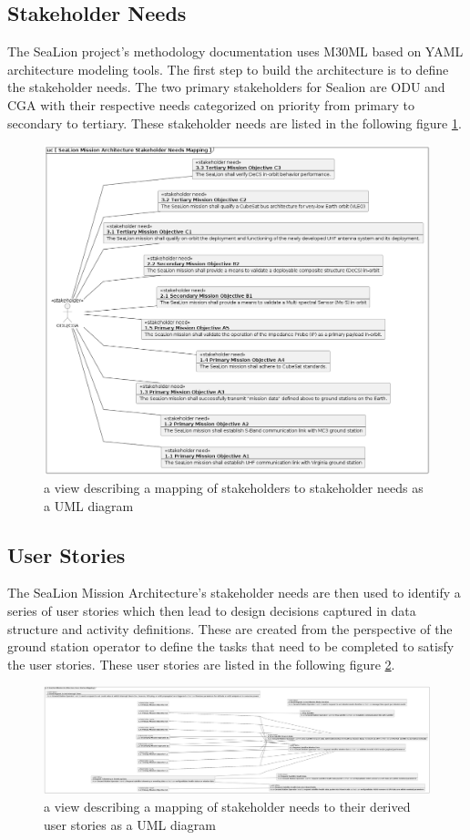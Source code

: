 \documentclass[conf]{new-aiaa}
\begin{document}
\subsection{Stakeholder Needs}

The SeaLion project's methodology documentation uses M30ML based on YAML architecture modeling tools. The first step to build the architecture is to define the stakeholder needs. The two primary stakeholders for Sealion are ODU and CGA with their respective needs categorized on priority from primary to secondary to tertiary. These stakeholder needs are listed in the following figure \ref{stakeholder-needs-mapping}.

\begin{figure}[hbt!]
    \centering
    \includegraphics[width=.5\textwidth]{stakeholder-needs-mapping}
    \caption{a view describing a mapping of stakeholders to stakeholder needs as a UML diagram}
    \label{stakeholder-needs-mapping}
\end{figure}

\subsection{User Stories}

The SeaLion Mission Architecture's stakeholder needs are then used to identify a series of user stories which then lead to design decisions captured in data structure and activity definitions. These are created from the perspective of the ground station operator to define the tasks that need to be completed to satisfy the user stories. These user stories are listed in the following figure \ref{user-stories-mapping}.

\begin{figure}[hbt!]
    \centering
    \includegraphics[width=.5\textwidth]{user-stories-mapping}
    \caption{a view describing a mapping of stakeholder needs to their derived user stories as a UML diagram}
    \label{user-stories-mapping}
\end{figure}
\end{document}
